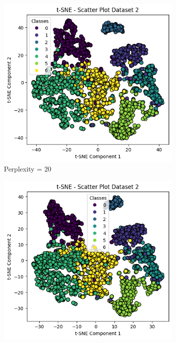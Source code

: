 \documentclass[12pt]{report}
\begin{document}
	\begin{figure}[H]
		\centering
		\begin{subfigure}{.33\textwidth} %
			\centering
			\includegraphics[width=\linewidth]{../t-SNE/OutputPlot/Dataset2Outputplot/perplexity20.png}
			\caption{Perplexity = 20}
			\label{Dataset2perplexity20}
		\end{subfigure}%
		\begin{subfigure}{.33\textwidth} %
			\centering
			\includegraphics[width=\linewidth]{../t-SNE/OutputPlot/Dataset2Outputplot/perplexity35.png}

\end{subfigure}
\end{figure}
\end{document}
